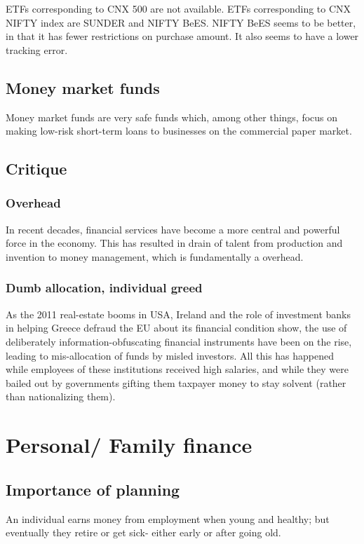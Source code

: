 \documentclass[oneside, article]{memoir}
\begin{document}
ETFs corresponding to CNX 500 are not available. ETFs corresponding to CNX NIFTY index are SUNDER and NIFTY BeES. NIFTY BeES seems to be better, in that it has fewer restrictions on purchase amount. It also seems to have a lower tracking error.

\subsection{Money market funds}
Money market funds are very safe funds which, among other things, focus on making low-risk short-term loans to businesses on the commercial paper market.

\subsection{Critique}
\subsubsection{Overhead}
In recent decades, financial services have become a more central and powerful force in the economy. This has resulted in drain of talent from production and invention to money management, which is fundamentally a overhead.

\subsubsection{Dumb allocation, individual greed}
As the 2011 real-estate booms in USA, Ireland and the role of investment banks in helping Greece defraud the EU about its financial condition show, the use of deliberately information-obfuscating financial instruments have been on the rise, leading to mis-allocation of funds by misled investors. All this has happened while employees of these institutions received high salaries, and while they were bailed out by governments gifting them taxpayer money to stay solvent (rather than nationalizing them).

\section{Personal/ Family finance}
\subsection{Importance of planning}
An individual earns money from employment when young and healthy; but eventually they retire or get sick- either early or after going old.
\end{document}

